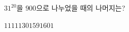 $31^{20}$을 $900$으로 나누었을 때의 나머지는?
\begin{choices32}{$11$}{$111$}{$301$}{$591$}{$601$}\end{choices32}
